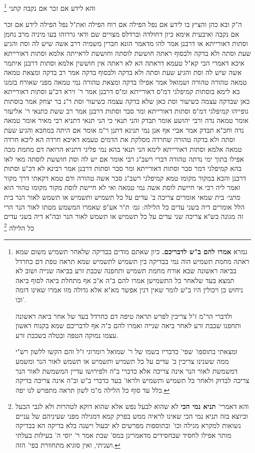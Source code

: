 \documentclass[12pt, openany]{book}
\newcommand{\footnotecomment}[1]{\footnote{#1}}
\newcommand{\commenta}[1]{\footnotecomment{#1}}
\begin{document}
{והא לידע אם זכר אם נקבה קתני 
\commenta{גמרא \textbf{אמרו להם ב"ש לדבריכם.}  כיון שאתם מודים בבדיקה שלאחר תשמיש משום שמא ראתה מחמת תשמיש הוה נמי בבדיקה בין תשמיש לתשמיש שמא תראה טפת דם כחרדל בביאה ראשונה שבא אורח מחמת תשמיש ותחפנה שכבת זרע בביאה שנייה ושוב לא תמצא בעד שלאחר כל התשמישן אמרו להם ב"ה א"כ אף מתחלת ביאה לסוף ביאה ניחוש כן ויכולין היו ב"ש לומר שאין דנין אפשר מא"א אלא גדולה מזו אמרו שאינו דומה וכו'.\par ולדברי הר"מ ז"ל צריכין לפרש תראה טיפה דם כחרדל בעד של אחר ביאה ראשונה ותחפנו שכבת זרע לאחר ביאה שנייה ואמרו להם ב"ה אף לדבריכם שמא בקנוח ראשון עצמו נמוקה הטפה ובטלה בשכבת זרע.\par  ומצאתי בתוספו' שפי' כדבריו בשמו של ר' שמואל רומרוגי ז"ל והם הקשו ללשון רש"י ממה ששנינו צריכין ב' עדים על כל תשמיש ותשמיש או תשמש לאור הנר ומשמע דמשמשת לאור הנר אינה צריכה אלא כדברי ב"ה ולפירושו עדיין המשמשת לאור הנר צריכה לבדוק ולאחר כל תשמיש ותשמיש ולראו' בעד כדברי ב"ש וב"ה אינה צריכה בדיקה כלל עד סוף כל הלילה מ"מ לשון תראה מתפרש לנו יפה. }

ה"ק  ובא כהן והציץ בו לידע אם נפל הפילה אם רוח הפילה ואת"ל נפל הפילה לידע אם זכר אם נקבה 
ואיבעית אימא  כיון דחולדה וברדלס מצויים שם ודאי גררוהו 
בעו מיניה מרב נחמן  וסתות דאורייתא או דרבנן 
אמר להו  מדאמר הונא חברין משמיה דרב אשה שיש לה וסת והגיע שעת וסתה ולא בדקה ולבסוף ראתה חוששת לוסתה וחוששת לראייתה אלמא וסתות דאורייתא 
איכא דאמרי הכי קא"ל  טעמא דראתה הא לא ראתה אין חוששין אלמא וסתות דרבנן 
איתמר  אשה שיש לה וסת והגיע שעת וסתה ולא בדקה ולבסוף בדקה  אמר רב  בדקה ומצאת טמאה טמאה טהורה טהורה  ושמואל אמר  אפילו בדקה ומצאת טהורה נמי טמאה מפני שאורח בזמנו בא 
לימא בוסתות קמיפלגי דמ"ס דאורייתא ומ"ס דרבנן 
אמר ר' זירא דכ"ע וסתות דאורייתא כאן שבדקה עצמה כשיעור וסת כאן שלא בדקה עצמה כשיעור וסת 
ר"נ בר יצחק אמר  בוסתות גופייהו קמיפלגי דמ"ס וסתות דאורייתא ומר סבר וסתות דרבנן 
אמר רב ששת  כתנאי ר' אליעזר אומר טמאה נדה
ורבי יהושע אומר תבדק  והני תנאי כי הני תנאי דתניא רבי מאיר אומר  טמאה נדה וחכ"א  תבדק 
אמר אביי  אף אנן נמי תנינא דתנן ר"מ אומר  אם היתה במחבא והגיע שעת וסתה ולא בדקה טהורה שחרדה מסלקת את הדמים  טעמא דאיכא חרדה הא ליכא חרדה טמאה אלמא וסתות דאורייתא 
לימא הני תנאי בהא נמי פליגי דתניא  הרואה דם מחמת מכה אפילו בתוך ימי נדתה טהורה דברי רשב"ג 
רבי אומר  אם יש לה וסת חוששת לוסתה 
מאי לאו בהא קמיפלגי דמר סבר וסתות דאורייתא ומר סבר וסתות דרבנן 
אמר רבינא  לא דכ"ע וסתות דרבנן והכא במקור מקומו טמא קמיפלגי 
רשב"ג סבר  אשה טהורה ודם טמא דקאתי דרך מקור 
ואמר ליה רבי  אי חיישת לוסת אשה נמי טמאה ואי לא חיישת לוסת מקור מקומו טהור הוא
{\large\emph{מתני׳}} בית שמאי אומרים צריכה ב' עדים על כל תשמיש ותשמיש או תשמש לאור הנר  בית הלל אומרים  דיה בשני עדים כל הלילה:
{\large\emph{גמ׳}} ת"ר אע"פ שאמרו המשמש מטתו לאור הנר הרי זה מגונה בש"א צריכה שני עדים על כל תשמיש או תשמש לאור הנר  ובה"א  דיה בשני עדים כל הלילה 
\commenta{והא דאמרי' \textbf{תניא נמי הכי}  לא שהוא לבעל נפש אלא שהוא דוקא לטהרות ולא לגבי הבעל וכיוצא בזה תניא נמי הכי שאינו לראיה ממש בפרק קמא דמגילה מפני שעיניהם של עניים נשואות למקרא מגילה וכו' ובתוספות מפרשים לא יבעול וישנה בלא בדיקה הא בבדיקה מותר אפילו לחסיד שבחסידים מדאמרינן במס' שבת אמר ר' יוסי ה' בעילות בעלתי ושניתי, ואין סוגיא מתחוורת בפי' הזה. }

}
\end{document}
